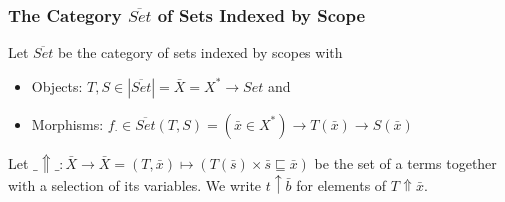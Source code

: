 \documentclass[aspectratio=169]{beamer}
\theoremstyle{remarkstyle}
\newtheorem*{remark}{Remark}
\begin{document}
\begin{frame}[fragile]
  \frametitle{The Category $\overline{Set}$ of Sets Indexed by Scope}
  \begin{definition}
    Let $\overline{Set}$ be the category of sets indexed by scopes with
    \begin{itemize}
      \item Objects: $T, S ∈ |\overline{Set}| = \bar{X} = X^* → Set $ and 
      \item Morphisms: $f_⋅ ∈ \overline{Set}(T, S) = (\bar{x}∈X^*) → T(\bar{x}) → S(\bar{x})$
    \end{itemize}
  \end{definition}
  \begin{definition}
    Let $\_⇑\_ : \bar{X} → \bar{X} = (T, \bar{x}) ↦ (T(\bar{s}) × \bar{s} ⊑ \bar{x})$ be the set of a terms together with a selection of its variables.
    We write $t ↑ \bar{b}$ for elements of  $T ⇑ \bar{x}$. 
  \end{definition}
\end{frame}

\end{document}
